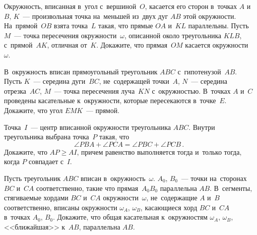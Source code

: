 \begin{problems}
\item
Окружность, вписанная в~угол с~вершиной~$O$, касается его сторон в~точках $A$
и~$B$, $K$~--- произвольная точка на~меньшей из~двух дуг $AB$ этой окружности.
На~прямой~$OB$ взята точка~$L$ такая, что прямые $OA$ и~$KL$ параллельны.
Пусть $M$~--- точка пересечения окружности~$\omega$, описанной около
треугольника $KLB$, с~прямой~$AK$, отличная от~$K$.
Докажите, что прямая~$OM$ касается окружности~$\omega$.

\item
В~окружность вписан прямоугольный треугольник $ABC$ с~гипотенузой~$AB$.
Пусть $K$~--- середина дуги~$BC$, не~содержащей точки~$A$, $N$~--- середина
отрезка~$AC$, $M$~--- точка пересечения луча~$KN$ с~окружностью.
В~точках $A$ и~$C$ проведены касательные к~окружности, которые пересекаются
в~точке~$E$.
Докажите, что угол $EMK$~--- прямой.

\item
Точка~$I$~--- центр вписанной окружности треугольника $ABC$.
Внутри треугольника выбрана точка~$P$ такая, что
\[
    \angle{PBA} + \angle{PCA} = \angle{PBC} + \angle{PCB}
\, . \]
Докажите, что $AP \geq AI$, причем равенство выполняется
тогда и~только тогда, когда $P$ совпадает с~$I$.

\item
Пусть треугольник $ABC$ вписан в~окружность~$\omega$.
$A_{0}$, $B_{0}$~--- точки на~сторонах $BC$ и~$CA$ соответственно, такие что
прямая~$A_{0}B_{0}$ параллельна $AB$.
В~сегменты, стягиваемые хордами $BC$ и~$CA$ окружности~$\omega$,
не~содержащие $A$ и~$B$ соответственно, вписаны
окружности $\omega_{A}$, $\omega_{B}$, касающиеся хорд $BC$ и~$CA$
в~точках $A_{0}$, $B_{0}$.
Докажите, что общая касательная к~окружностям $\omega_{A}$, $\omega_{B}$,
<<ближайшая>> к~$AB$, параллельна $AB$.

\fi

\end{problems}

